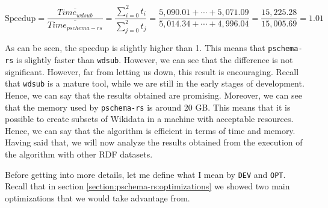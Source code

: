 \begin{equation}
    \text{Speedup} = \frac{\overline{Time_{wdsub}}}{\overline{Time_{pschema-rs}}} = \frac{\sum_{i=0}^{2}t_i}{\sum_{j=0}^{2}t_j} = \frac{5,090.01 + \cdots + 5,071.09}{5,014.34 + \cdots + 4,996.04} = \frac{15,225.28}{15,005.69} = 1.01
\end{equation}

As can be seen, the speedup is slightly higher than 1. This means that \texttt{pschema-rs} is slightly faster than \texttt{wdsub}. However, we can see that the difference is not significant. However, far from letting us down, this result is encouraging. Recall that \texttt{wdsub} is a mature tool, while we are still in the early stages of development. Hence, we can say that the results obtained are promising. Moreover, we can see that the memory used by \texttt{pschema-rs} is around 20 GB. This means that it is possible to create subsets of Wikidata in a machine with acceptable resources. Hence, we can say that the algorithm is efficient in terms of time and memory. Having said that, we will now analyze the results obtained from the execution of the algorithm with other RDF datasets.

Before getting into more details, let me define what I mean by \texttt{DEV} and \texttt{OPT}. Recall that in section \ref{section:pschema-rs:optimizations} we showed two main optimizations that we would take advantage from.

